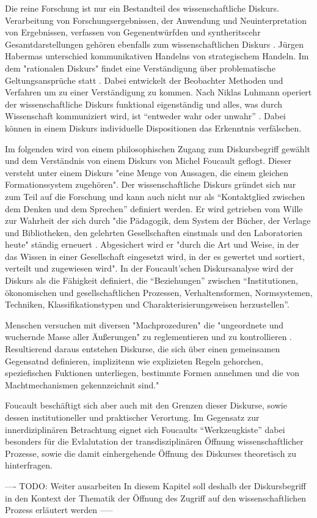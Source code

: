 Die reine Forschung ist nur ein Bestandteil des wissenschaftliche Diskurs\cite{suchen}. Verarbeitung von Forschungsergebnissen, der Anwendung und Neuinterpretation von Ergebnissen, verfassen von Gegenentwürfden und syntheritscehr Gesamtdarstellungen gehören ebenfalls zum wissenschaftlichen Diskurs \cite{suchen}. Jürgen Habermas unterschied kommunikativen Handelns von strategischem Handeln. Im dem "rationalen Diskurs" findet eine Verständigung über problematische Geltungsansprüche statt \cite{suchen}. Dabei entwickelt der Beobachter Methoden und Verfahren um zu einer Verständigung zu kommen. \cite{suchen} Nach Niklas Luhmann operiert der wissenschaftliche Diskurs funktional eigenständig und alles, was durch Wissenschaft kommuniziert wird, ist “entweder wahr oder unwahr” \cite{Luhmann1998}.  Dabei können in einem Diskurs individuelle Dispositionen das Erkenntnis verfälschen. 

Im folgenden wird von einem philosophischen Zugang zum Diskursbegriff gewählt und dem Verständnis von einem Diskurs von Michel Foucault geflogt. Dieser versteht unter einem Diskurs "eine Menge von Aussagen, die einem gleichen Formationssystem zugehören"\cite{foucault_archaologie_1981}. Der wissenschaftliche Diskurs gründet sich nur zum Teil auf die Forschung und kann auch nicht nur als “Kontaktglied zwischen dem Denken und dem Sprechen” \cite{foucault_ordnung_2003} definiert werden. Er wird getrieben vom Wille zur Wahrheit der sich durch "die Pädagogik, dem System der Bücher, der Verlage und Bibliotheken, den gelehrten Gesellschaften einstmals und den Laboratorien heute" ständig erneuert \cite{foucault_ordnung_2003}. Abgesichert wird er "durch die Art und Weise, in der das Wissen in einer Gesellschaft eingesetzt wird, in der es gewertet und sortiert, verteilt und zugewiesen wird"\cite{foucault_ordnung_2003}. In der Foucault'schen Diskursanalyse wird der Diskurs als die Fähigkeit definiert, die “Beziehungen” zwischen “Institutionen, ökonomischen und gesellschaftlichen Prozessen, Verhaltensformen, Normsystemen, Techniken, Klassifikationstypen und Charakterisierungsweisen herzustellen”\cite{foucault_archaologie_1981}. 

Menschen versuchen mit diversen "Machprozeduren" die "ungeordnete und wuchernde Masse aller Äußerungen" zu reglementieren und zu kontrollieren \cite{Neymeyer_diskurs_2010}. Resultierend daraus entstehen Diskurse, die sich über einen gemeinsamen Gegensatnd definieren, implizitenn wie explizieten Regeln gehorchen, speziefischen Fuktionen unterliegen, bestimmte Formen annehmen und die von Machtmechanismen gekennzeichnit sind." \cite{Neymeyer_diskurs_2010}

Foucault beschäftigt sich aber auch mit den Grenzen dieser Diskurse, sowie dessen institutioneller und praktischer Verortung. Im Gegensatz zur innerdiziplinären Betrachtung eignet sich Foucaults “Werkzeugkiste”\cite{Honneth_2003} dabei besonders für die Evlalutation der transdisziplinären Öffnung wissenschaftlicher Prozesse, sowie die damit einhergehende Öffnung des Diskurses theoretisch zu hinterfragen. 

---- TODO: Weiter ausarbeiten In diesem Kapitel soll deshalb der Diskursbegriff in den Kontext der Thematik der Öffnung des Zugriff auf den wissenschaftlichen Prozess erläutert werden -----
